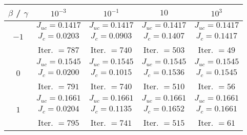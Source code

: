 \begin{table}[h]
	\begin{tabular}{ ||c|| c | c |c | c ||}
		\hline
		$\beta$ / $\gamma$ & $10^{-3}$  & $10^{-1}$  & $10$ & $10^3$ \\ 
		\hline 
		& $J_{uc} = 0.1417$ & $J_{uc} = 0.1417$  & $J_{uc} = 0.1417$ & $J_{uc} = 0.1417$\\ 
		$-1$ & $J_c = 0.0203$ & $J_c = 0.0903$ & $J_c = 0.1407$ & $J_c = 0.1417$\\ 
		& Iter. $= 787$ & Iter. $= 740$  & Iter. $= 503$ & Iter. $= 49$\\ 
		\hline
		& $J_{uc} = 0.1545$ & $J_{uc} = 0.1545$   & $J_{uc} = 0.1545$& $J_{uc} = 0.1545$\\
		$0$  & $J_c = 0.0200$ & $J_c = 0.1015$  & $J_c = 0.1536$ & $J_c = 0.1545$\\ 
		& Iter. $= 791$ & Iter. $= 740$  & Iter. $= 510$ & Iter. $= 56$\\ 
		\hline
		& $J_{uc} = 0.1661$ & $J_{uc} = 0.1661$  & $J_{uc} = 0.1661$ & $J_{uc} = 0.1661$\\
		$1$  & $J_c = 0.0204$ & $J_c = 0.1135$  & $J_c = 0.1652$ & $J_c = 0.1661$\\ 
		& Iter. $= 795$ & Iter. $= 741$  & Iter. $= 515$ & Iter. $= 61$\\ 
		\hline 
	\end{tabular}
	\caption{}
	\label{TabNFlowEx4}
\end{table}


